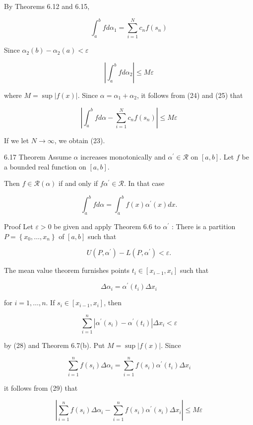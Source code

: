 \documentclass[10pt]{article}
\begin{document}
By Theorems 6.12 and 6.15,

$$
\int_{a}^{b} f d \alpha_{1}=\sum_{i=1}^{N} c_{n} f\left(s_{n}\right)
$$

Since $\alpha_{2}(b)-\alpha_{2}(a)<\varepsilon$

$$
\left|\int_{a}^{b} f d \alpha_{2}\right| \leq M \varepsilon
$$

where $M=\sup |f(x)|$. Since $\alpha=\alpha_{1}+\alpha_{2}$, it follows from (24) and (25) that

$$
\left|\int_{a}^{b} f d \alpha-\sum_{i=1}^{N} c_{n} f\left(s_{n}\right)\right| \leq M \varepsilon
$$

If we let $N \rightarrow \infty$, we obtain (23).

6.17 Theorem Assume $\alpha$ increases monotonically and $\alpha^{\prime} \in \mathscr{R}$ on $[a, b]$. Let $f$ be a bounded real function on $[a, b]$.

Then $f \in \mathscr{R}(\alpha)$ if and only if $f \alpha^{\prime} \in \mathscr{R}$. In that case

$$
\int_{a}^{b} f d \alpha=\int_{a}^{b} f(x) \alpha^{\prime}(x) d x .
$$

Proof Let $\varepsilon>0$ be given and apply Theorem 6.6 to $\alpha^{\prime}$ : There is a partition $P=\left\{x_{0}, \ldots, x_{n}\right\}$ of $[a, b]$ such that

$$
U\left(P, \alpha^{\prime}\right)-L\left(P, \alpha^{\prime}\right)<\varepsilon .
$$

The mean value theorem furnishes points $t_{i} \in\left[x_{i-1}, x_{i}\right]$ such that

$$
\Delta \alpha_{i}=\alpha^{\prime}\left(t_{i}\right) \Delta x_{i}
$$

for $i=1, \ldots, n$. If $s_{i} \in\left[x_{i-1}, x_{i}\right]$, then

$$
\sum_{i=1}^{n}\left|\alpha^{\prime}\left(s_{i}\right)-\alpha^{\prime}\left(t_{i}\right)\right| \Delta x_{i}<\varepsilon
$$

by (28) and Theorem 6.7(b). Put $M=\sup |f(x)|$. Since

$$
\sum_{i=1}^{n} f\left(s_{i}\right) \Delta \alpha_{i}=\sum_{i=1}^{n} f\left(s_{i}\right) \alpha^{\prime}\left(t_{i}\right) \Delta x_{i}
$$

it follows from (29) that

$$
\left|\sum_{i=1}^{n} f\left(s_{i}\right) \Delta \alpha_{i}-\sum_{i=1}^{n} f\left(s_{i}\right) \alpha^{\prime}\left(s_{i}\right) \Delta x_{i}\right| \leq M \varepsilon
$$
\end{document}
